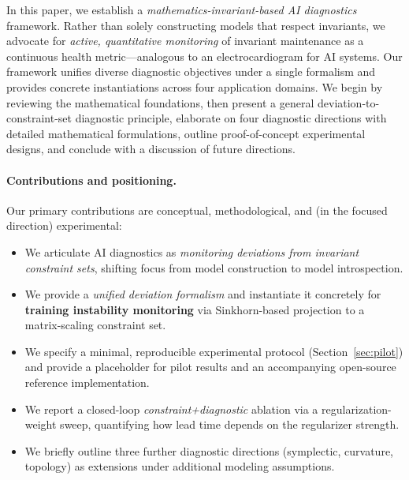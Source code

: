 \documentclass[11pt]{article}
\begin{document}
In this paper, we establish a \emph{mathematics-invariant-based AI diagnostics} framework. Rather than solely constructing models that respect invariants, we advocate for \emph{active, quantitative monitoring} of invariant maintenance as a continuous health metric---analogous to an electrocardiogram for AI systems. Our framework unifies diverse diagnostic objectives under a single formalism and provides concrete instantiations across four application domains. We begin by reviewing the mathematical foundations, then present a general deviation-to-constraint-set diagnostic principle, elaborate on four diagnostic directions with detailed mathematical formulations, outline proof-of-concept experimental designs, and conclude with a discussion of future directions.
\paragraph{Contributions and positioning.}
Our primary contributions are conceptual, methodological, and (in the focused direction) experimental:
\begin{itemize}
\item We articulate AI diagnostics as \emph{monitoring deviations from invariant constraint sets}, shifting focus from model construction to model introspection.
\item We provide a \emph{unified deviation formalism} and instantiate it concretely for \textbf{training instability monitoring} via Sinkhorn-based projection to a matrix-scaling constraint set.
\item We specify a minimal, reproducible experimental protocol (Section~\ref{sec:pilot}) and provide a placeholder for pilot results and an accompanying open-source reference implementation.
\item We report a closed-loop \emph{constraint+diagnostic} ablation via a regularization-weight sweep, quantifying how lead time depends on the regularizer strength.
\item We briefly outline three further diagnostic directions (symplectic, curvature, topology) as extensions under additional modeling assumptions.
\end{itemize}
\end{document}
